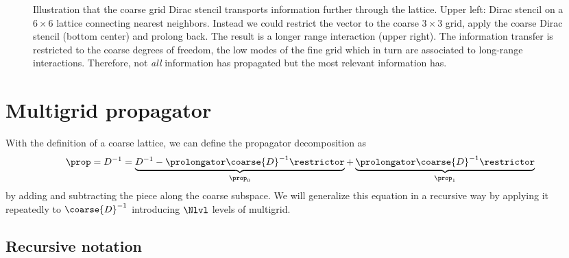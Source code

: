 \begin{figure}
\centering

\caption{Illustration that the coarse grid Dirac stencil transports information further through the lattice. Upper left: Dirac stencil on a $6 \times 6$ lattice connecting nearest neighbors. Instead we could restrict the vector to the coarse $3 \times 3$ grid, apply the coarse Dirac stencil (bottom center) and prolong back. The result is a longer range interaction (upper right). The information transfer is restricted to the coarse degrees of freedom, \ie the low modes of the fine grid which in turn are associated to long-range interactions. Therefore, not \emph{all} information has propagated but the most relevant information has.}
\label{fig:coarse:stencil}
\end{figure}

\section{Multigrid propagator}

With the definition of a coarse lattice, we can define the propagator decomposition as
\begin{equation} \label{eq:mg:prop:decomp:2lvl}
\prop = D^{-1}
= \underbrace{
	D^{-1}
	- \prolongator \coarse{D}^{-1} \restrictor
}_{\prop_0}
+ \underbrace{
	\prolongator \coarse{D}^{-1} \restrictor
}_{\prop_1}
\end{equation}
by adding and subtracting the piece along the coarse subspace.
We will generalize this equation in a recursive way by applying it repeatedly to $\coarse{D}^{-1}$ introducing $\Nlvl$ levels of multigrid.

\subsection{Recursive notation}

